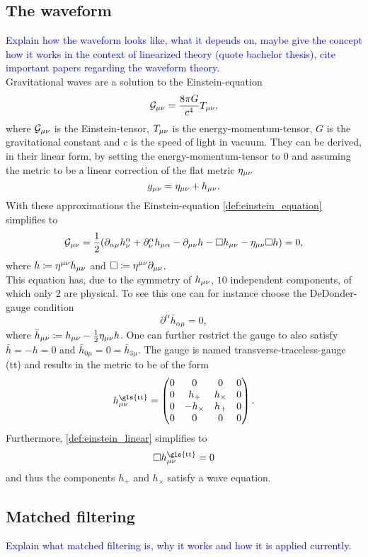 \subsection{The waveform}
\textcolor{blue}{Explain how the waveform looks like, what it depends on, maybe give the concept how it works in the context of linearized theory (quote bachelor thesis), cite important papers regarding the waveform theory.}\\
Gravitational waves are a solution to the Einstein-equation
\begin{equation}\label{def:einstein_equation}
\mathcal{G}_{\mu\nu} = \frac{8\pi G}{c^4}T_{\mu\nu},
\end{equation}
where $\mathcal{G}_{\mu\nu}$ is the Einstein-tensor, $T_{\mu\nu}$ is the energy-momentum-tensor, $G$ is the gravitational constant and $c$ is the speed of light in vacuum. They can be derived, in their linear form, by setting the energy-momentum-tensor to $0$ and assuming the metric to be a linear correction of the flat metric $\eta_{\mu\nu}$
\begin{equation}
g_{\mu\nu} = \eta_{\mu\nu} + h_{\mu\nu}.
\end{equation}
With these approximations the Einstein-equation \eqref{def:einstein_equation} simplifies to
\begin{equation}\label{def:einstein_linear}
\mathcal{G}_{\mu\nu}=\frac{1}{2}{\left( \partial_{\alpha\mu}h^\alpha_\nu+\partial^\alpha_\nu h_{\mu\alpha} - \partial_{\mu\nu} h- \Box h_{\mu\nu} - \eta_{\mu\nu}\Box h \right)} = 0,
\end{equation}
where $h\coloneqq\eta^{\mu\nu} h_{\mu\nu}$ and $\Box\coloneqq\eta^{\mu\nu}\partial_{\mu\nu}$.\\
This equation has, due to the symmetry of $h_{\mu\nu}$, $10$ independent components, of which only $2$ are physical. To see this one can for instance choose the DeDonder-gauge condition
\begin{equation}
\partial^\alpha \bar{h}_{\alpha\mu} = 0,
\end{equation}
where $\bar{h}_{\mu\nu}\coloneqq h_{\mu\nu} - \frac{1}{2}\eta_{\mu\nu} h$. One can further restrict the gauge to also satisfy $\bar{h}=-h=0$ and $\bar{h}_{0\mu} = 0 = \bar{h}_{3\mu}$. The gauge is named transverse-traceless-gauge (\gls{tt}) and results in the metric to be of the form
\begin{equation}
h_\mn^\text{\gls{tt}}=
\begin{pmatrix}
	0 & 0         & 0        & 0\\
	0 & h_+       & h_\times & 0\\
	0 & -h_\times & h_+      & 0\\
	0 & 0         & 0        & 0\\
\end{pmatrix}.
\end{equation}
Furthermore, \eqref{def:einstein_linear} simplifies to
\begin{equation}
\Box h_\mn^\text{\gls{tt}} = 0
\end{equation}
and thus the components $h_+$ and $h_\times$ satisfy a wave equation.
\subsection{Matched filtering}
\textcolor{blue}{Explain what matched filtering is, why it works and how it is applied currently.}